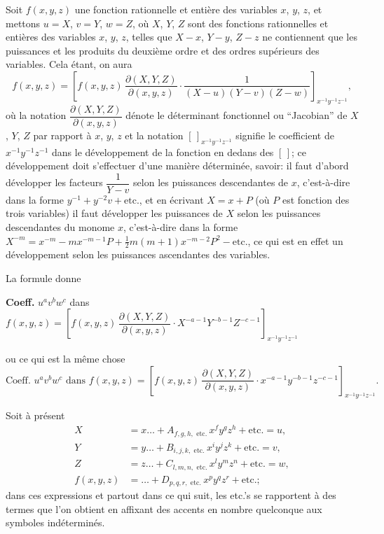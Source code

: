\documentclass[11pt,a4paper]{book}
\theoremstyle{plain}
\begin{document}
Soit $f(x,y,z)$ une fonction rationnelle et enti\`{e}re des variables $x$, $y$, $z$, et mettons $u=X$, $v=Y$, $w=Z$, o\`{u} $X$, $Y$, $Z$ sont des fonctions rationnelles et enti\`{e}res des variables $x$, $y$, $z$, telles que $X-x$, $Y-y$, $Z-z$ ne contiennent que les puissances et les produits du deuxi\`{e}me ordre et des ordres sup\'{e}rieurs des variables. Cela \'{e}tant, on aura
\[
f(x,y,z)=[f(x,y,z)\,\frac{\partial(X,Y,Z)}{\partial(x,y,z)}\cdot\frac{1}{(X-u)(Y-v)(Z-w)}]_{x^{-1}y^{-1}z^{-1}},
\]
o\`{u} la notation $\dfrac{\partial(X,Y,Z)}{\partial(x,y,z)}$ d\'{e}note le d\'{e}terminant fonctionnel ou ``Jacobian'' de $X$, $Y$, $Z$ par rapport \`{a} $x$, $y$, $z$ et la notation $[\,]_{x^{-1}y^{-1}z^{-1}}$ signifie le coefficient de $x^{-1}y^{-1}z^{-1}$ dans le d\'{e}veloppement de la fonction en dedans des $[\,]$; ce d\'{e}veloppement doit s'effectuer d'une mani\`{e}re d\'{e}termin\'{e}e, savoir: il faut d'abord d\'{e}velopper les facteurs $\dfrac{1}{Y-v}$ selon les puissances descendantes de $x$, c'est-\`{a}-dire dans la forme $y^{-1}+y^{-2}v+\text{etc.}$, et en \'{e}crivant $X=x+P$ (o\`{u} $P$ est fonction des trois variables) il faut d\'{e}velopper les puissances de $X$ selon les puissances descendantes du monome $x$, c'est-\`{a}-dire dans la forme $X^{-m}=x^{-m}-mx^{-m-1}P+\tfrac{1}{2}m(m+1)x^{-m-2}P^2-\text{etc.}$, ce qui est en effet un d\'{e}veloppement selon les puissances ascendantes des variables.

La formule donne

\textbf{Coeff.} $u^av^bw^c$ dans $f(x,y,z)=[f(x,y,z)\,\dfrac{\partial(X,Y,Z)}{\partial(x,y,z)}\cdot X^{-a-1}Y^{-b-1}Z^{-c-1}]_{x^{-1}y^{-1}z^{-1}}$

ou ce qui est la m\^{e}me chose
\[
\text{Coeff. }u^av^bw^c\text{ dans }f(x,y,z)=[f(x,y,z)\,\frac{\partial(X,Y,Z)}{\partial(x,y,z)}\cdot x^{-a-1}y^{-b-1}z^{-c-1}]_{x^{-1}y^{-1}z^{-1}}.
\]

Soit \`{a} pr\'{e}sent
\begin{align*}
X &= x\ldots+A_{f,g,h,\text{ etc.}}\,x^fy^gz^h+\text{etc.}=u,\\
Y &= y\ldots+B_{i,j,k,\text{ etc.}}\,x^iy^jz^k+\text{etc.}=v,\\
Z &= z\ldots+C_{l,m,n,\text{ etc.}}\,x^ly^mz^n+\text{etc.}=w,\\
f(x,y,z) &= \ldots+D_{p,q,r,\text{ etc.}}\,x^py^qz^r+\text{etc.};
\end{align*}
dans ces expressions et partout dans ce qui suit, les etc.'s se rapportent \`{a} des termes que l'on obtient en affixant des accents en nombre quelconque aux symboles ind\'{e}termin\'{e}s.
\end{document}
